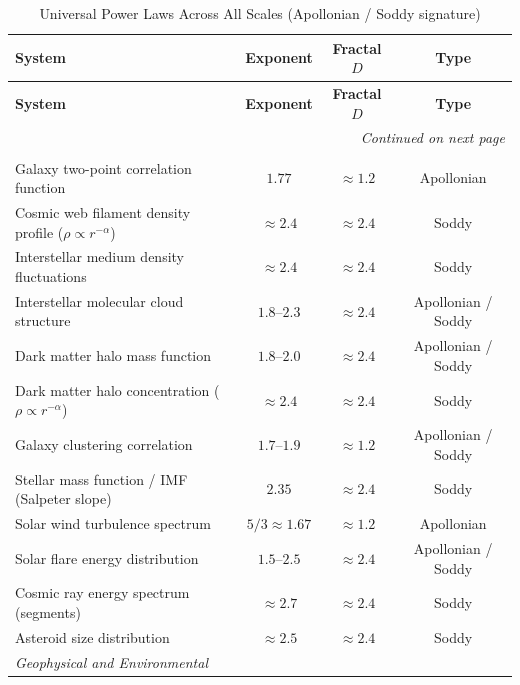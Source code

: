 \documentclass[11pt,a4paper]{article}
\begin{document}
      \begin{longtable}{p{6.8cm}ccc}
      \caption{Universal Power Laws Across All Scales (Apollonian / Soddy signature)} \\
      \toprule
      \textbf{System} & \textbf{Exponent} & \textbf{Fractal $D$} & \textbf{Type} \\
      \midrule
      \endfirsthead
      \toprule
      \textbf{System} & \textbf{Exponent} & \textbf{Fractal $D$} & \textbf{Type} \\
      \midrule
      \endhead
      \midrule
      \multicolumn{4}{r}{\textit{Continued on next page}} \\
      \endfoot
      \bottomrule
      \endlastfoot
      \multicolumn{4}{l}{\textit{Astrophysical and Cosmological}} \\
      \midrule
      Galaxy two-point correlation function & $1.77$ & $\approx 1.2$ & Apollonian \\
      Cosmic web filament density profile ($\rho \propto r^{-\alpha}$) & $\approx 2.4$ & $\approx 2.4$ & Soddy \\
      Interstellar medium density fluctuations & $\approx 2.4$ & $\approx 2.4$ & Soddy \\
      Interstellar molecular cloud structure & $1.8$--$2.3$ & $\approx 2.4$ & Apollonian / Soddy \\
      Dark matter halo mass function & $1.8$--$2.0$ & $\approx 2.4$ & Apollonian / Soddy \\
      Dark matter halo concentration ($\rho \propto r^{-\alpha}$) & $\approx 2.4$ & $\approx 2.4$ & Soddy \\
      Galaxy clustering correlation & $1.7$--$1.9$ & $\approx 1.2$ & Apollonian / Soddy \\
      Stellar mass function / IMF (Salpeter slope) & $2.35$ & $\approx 2.4$ & Soddy \\
      Solar wind turbulence spectrum & $5/3 \approx 1.67$ & $\approx 1.2$ & Apollonian \\
      Solar flare energy distribution & $1.5$--$2.5$ & $\approx 2.4$ & Apollonian / Soddy \\
      Cosmic ray energy spectrum (segments) & $\approx 2.7$ & $\approx 2.4$ & Soddy \\
      Asteroid size distribution & $\approx 2.5$ & $\approx 2.4$ & Soddy \\
      \midrule
      \multicolumn{4}{l}{\textit{Geophysical and Environmental}} \\

\end{longtable}
\end{document}
